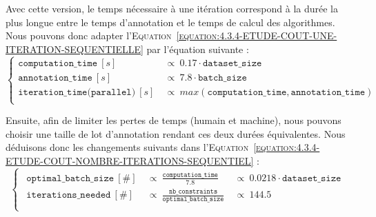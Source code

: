 			Avec cette version, le temps nécessaire à une itération correspond à la durée la plus longue entre le temps d'annotation et le temps de calcul des algorithmes.
			Nous pouvons donc adapter l'\textsc{Equation~\ref{equation:4.3.4-ETUDE-COUT-UNE-ITERATION-SEQUENTIELLE}} par l'équation suivante :
			\begin{equation}
				\label{equation:4.3.4-ETUDE-COUT-UNE-ITERATION-PARALLELE}
				\begin{cases}
					\texttt{computation\_time}~[s]&
						~\propto~0.17 \cdot \texttt{dataset\_size}\\
					\texttt{annotation\_time}~[s]&
						~\propto~7.8 \cdot \texttt{batch\_size} \\
					\texttt{iteration\_time(parallel)}~[s]&
						~\propto~max(\texttt{computation\_time}, \texttt{annotation\_time}) \\
				\end{cases}
			\end{equation}
			
			Ensuite, afin de limiter les pertes de temps (humain et machine), nous pouvons choisir une taille de lot d'annotation rendant ces deux durées équivalentes.
			Nous déduisons donc les changements suivants dans l'\textsc{Equation~\ref{equation:4.3.4-ETUDE-COUT-NOMBRE-ITERATIONS-SEQUENTIEL}} :
			\begin{equation}
				\label{equation:4.3.4-ETUDE-COUT-NOMBRE-ITERATIONS-PARALLELE}
				\begin{cases}
				\begin{aligned}
					\texttt{optimal\_batch\_size}~[\#]&
						~\propto~\frac{\texttt{computation\_time}}{7.8}&
						~\propto~0.0218 \cdot \texttt{dataset\_size} \\
					\texttt{iterations\_needed}~[\#] &
						~\propto~\frac{\texttt{nb\_constraints}}{\texttt{optimal\_batch\_size}}&
						~\propto~144.5 \\
				\end{aligned}
				\end{cases}
			\end{equation}
			
